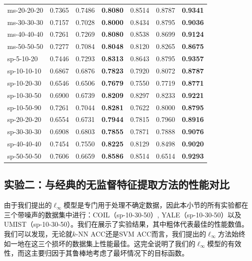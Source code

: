 \begin{table}[!ht]
{\begin{tabular}{lcccccc}
    ms-20-20-20  & 0.7365 & 0.7486 & \textbf{0.8080} & 0.8514 & 0.8787 & \textbf{0.9341} \\
    ms-30-30-30  & 0.7157 & 0.7028 & \textbf{0.8000} & 0.8434 & 0.8795 & \textbf{0.9036} \\
    ms-40-40-40  & 0.7261 & 0.7269 & \textbf{0.8080} & 0.8538 & 0.8699 & \textbf{0.9124} \\
    ms-50-50-50  & 0.7277 & 0.7084 & \textbf{0.8048} & 0.8120 & 0.8265 & \textbf{0.8675} \\
    \hline\hline
    sp-5-10-20 & 0.7446 & 0.7293 & \textbf{0.8313} & 0.8643 & 0.8795 & \textbf{0.9357} \\
    sp-10-10-10 & 0.6867 & 0.6876 & \textbf{0.7823} & 0.7920 & 0.8072 & \textbf{0.8787} \\
    sp-10-20-30                  & 0.6546   & 0.6506   & \textbf{0.7679}  & 0.7550   & 0.7719                           & \textbf{0.8771} \\
    sp-10-30-50  & 0.6900 & 0.6739 & \textbf{0.8209} & 0.8297 & 0.8233 & \textbf{0.9221} \\
    sp-10-50-90  & 0.7261 & 0.7044 & \textbf{0.8281} & 0.7622 & 0.8000 & \textbf{0.8795} \\
    sp-20-20-20  & 0.6554 & 0.6731 & \textbf{0.7944} & 0.7815 & 0.7960 & \textbf{0.8916} \\
    sp-30-30-30  & 0.6908 & 0.6803 & \textbf{0.7855} & 0.7871 & 0.7888 & \textbf{0.9076} \\
    sp-40-40-40  & 0.7454 & 0.7550 & \textbf{0.8225} & 0.8129 & 0.8498 & \textbf{0.9020} \\
    sp-50-50-50  & 0.7606 & 0.6659 & \textbf{0.8586} & 0.8514 & 0.6514 & \textbf{0.9293} \\
    \hline
    \end{tabular}%
        }
    \end{table}
    
\subsection{实验二：与经典的无监督特征提取方法的性能对比}
由于我们提出的$\ell_{\infty}$模型是专门用于处理不确定数据，因此本小节的所有实验都在三个带噪声的数据集中进行：COIL（sp-10-30-50）, YALE（sp-10-30-50）以及UMIST（sp-10-30-50）。我们在展示了实验结果，其中粗体代表最佳的性能数值。我们可以发现，无论就$k$-NN ACC还是SVM ACC而言，我们提出的$\ell_{\infty}$方法始终如一地在这三个损坏的数据集上性能最佳。这完全说明了我们的$\ell_{\infty}$模型的有效性，而这主要归因于其鲁棒地考虑了最坏情况下的目标函数。

